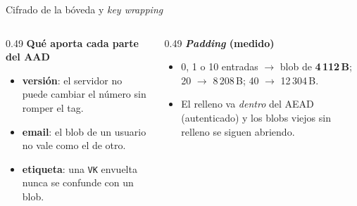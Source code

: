 \documentclass[aspectratio=169,10pt]{beamer}
\newcommand{\key}[1]{\textcolor{cripto}{\texttt{#1}}}
\begin{document}
\begin{frame}{Cifrado de la bóveda y \emph{key wrapping}}
  \vspace{1mm}
  \begin{columns}[T]
    \begin{column}{0.49\textwidth}
      \scriptsize
      \textbf{Qué aporta cada parte del AAD}
      \begin{itemize}
        \item \textbf{versión}: el servidor no puede cambiar el número sin romper el tag.
        \item \textbf{email}: el blob de un usuario no vale como el de otro.
        \item \textbf{etiqueta}: una \key{VK} envuelta nunca se confunde con un blob.
      \end{itemize}
    \end{column}
    \begin{column}{0.49\textwidth}
      \scriptsize
      \textbf{\emph{Padding} (medido)}
      \begin{itemize}
        \item 0, 1 o 10 entradas $\to$ blob de \textbf{4\,112\,B}; 20 $\to$ 8\,208\,B; 40 $\to$ 12\,304\,B.
        \item El relleno va \emph{dentro} del AEAD (autenticado) y los blobs viejos sin relleno
              se siguen abriendo.
      \end{itemize}
    \end{column}
  \end{columns}
\end{frame}
\end{document}
